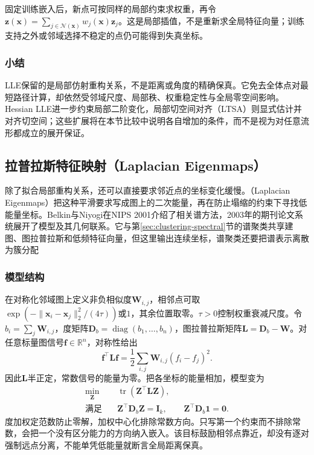 固定训练嵌入后，新点可按同样的局部约束求权重，再令$\bm{z}(\bm{x})=\sum_{j\in\mathcal{N}(\bm{x})}w_j(\bm{x})\bm{z}_j$。这是局部插值，不是重新求全局特征向量；训练支持之外或邻域选择不稳定的点仍可能得到失真坐标。

\subsubsection{小结}

LLE保留的是局部仿射重构关系，不是距离或角度的精确保真。它免去全体点对最短路径计算，却依然受邻域尺度、局部秩、权重稳定性与全局零空间影响。Hessian LLE进一步约束局部二阶变化，局部切空间对齐（LTSA）则显式估计并对齐切空间；这些扩展将在本节比较中说明各自增加的条件，而不是视为对任意流形都成立的展开保证。

\subsection{拉普拉斯特征映射（Laplacian Eigenmaps）}
\label{sec:dim-le}

除了拟合局部重构关系，还可以直接要求邻近点的坐标变化缓慢。（Laplacian Eigenmaps）把这种平滑要求写成图上的二次能量，再在防止塌缩的约束下寻找低能量坐标。Belkin与Niyogi在NIPS 2001介绍了相关谱方法，2003年的期刊论文系统展开了模型及其几何联系。它与第\ref{sec:clustering-spectral}节的谱聚类共享建图、图拉普拉斯和低频特征向量，但这里输出连续坐标，谱聚类还要把谱表示离散为簇分配

\subsubsection{模型结构}

在对称化邻域图上定义非负相似度$\bm{W}_{i,j}$，相邻点可取$\exp(-\lVert\bm{x}_i-\bm{x}_j\rVert_2^2/(4\tau))$或$1$，其余位置取零。$\tau>0$控制权重衰减尺度。令$b_i=\sum_j\bm{W}_{i,j}$，度矩阵$\bm{D}_b=\operatorname{diag}(b_1,\ldots,b_n)$，图拉普拉斯矩阵$\bm{L}=\bm{D}_b-\bm{W}$。对任意标量图信号$\bm{f}\in\mathbb{R}^n$，对称性给出
\begin{equation}
  \label{eq:dim-le-energy}
  \bm{f}^{\top}\bm{L}\bm{f}
  =\frac12\sum_{i,j}\bm{W}_{i,j}(f_i-f_j)^2.
\end{equation}
因此$\bm{L}$半正定，常数信号的能量为零。把各坐标的能量相加，模型变为
\begin{equation}
  \label{eq:dim-le-objective}
  \begin{aligned}
    \min_{\bm{Z}}\quad&
      \operatorname{tr}(\bm{Z}^{\top}\bm{L}\bm{Z}),\\
    \text{满足}\quad&
      \bm{Z}^{\top}\bm{D}_b\bm{Z}=\bm{I}_k,\qquad
      \bm{Z}^{\top}\bm{D}_b\bm{1}=\bm{0}.
  \end{aligned}
\end{equation}
度加权定范数防止零解，加权中心化排除常数方向。只写第一个约束而不排除常数，会把一个没有区分能力的方向纳入嵌入。该目标鼓励相邻点靠近，却没有逐对强制远点分离，不能单凭低能量就断言全局距离保真。

